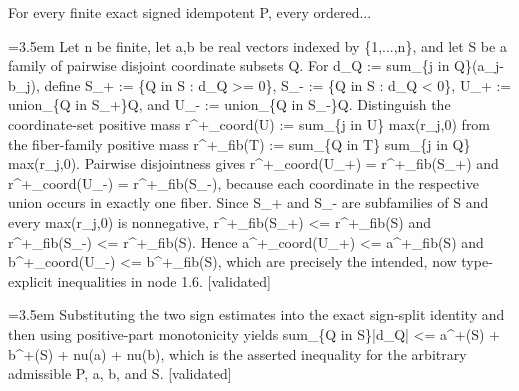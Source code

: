 \documentclass{article}
\newcommand{\step}[1]{\par\noindent\hangindent=3.5em\hangafter=1%
  \makebox[3.5em][l]{\textbf{#1.}}}
\newcommand{\steptag}[1]{\hfill{\small\textsf{[#1]}}}
\begin{document}
\begin{proofbox}{For every finite exact signed idempotent P, every ordered...}
\step{1.6.1} Let n be finite, let a,b be real vectors indexed by \{1,...,n\}, and let S be a family of pairwise disjoint coordinate subsets Q. For d\_Q := sum\_\{j in Q\}(a\_j-b\_j), define S\_+ := \{Q in S : d\_Q >= 0\}, S\_- := \{Q in S : d\_Q < 0\}, U\_+ := union\_\{Q in S\_+\}Q, and U\_- := union\_\{Q in S\_-\}Q. Distinguish the coordinate-set positive mass r\textasciicircum{}+\_coord(U) := sum\_\{j in U\} max(r\_j,0) from the fiber-family positive mass r\textasciicircum{}+\_fib(T) := sum\_\{Q in T\} sum\_\{j in Q\} max(r\_j,0). Pairwise disjointness gives r\textasciicircum{}+\_coord(U\_+) = r\textasciicircum{}+\_fib(S\_+) and r\textasciicircum{}+\_coord(U\_-) = r\textasciicircum{}+\_fib(S\_-), because each coordinate in the respective union occurs in exactly one fiber. Since S\_+ and S\_- are subfamilies of S and every max(r\_j,0) is nonnegative, r\textasciicircum{}+\_fib(S\_+) <= r\textasciicircum{}+\_fib(S) and r\textasciicircum{}+\_fib(S\_-) <= r\textasciicircum{}+\_fib(S). Hence a\textasciicircum{}+\_coord(U\_+) <= a\textasciicircum{}+\_fib(S) and b\textasciicircum{}+\_coord(U\_-) <= b\textasciicircum{}+\_fib(S), which are precisely the intended, now type-explicit inequalities in node 1.6. \steptag{validated} \\[4pt]
\step{1.7} Substituting the two sign estimates into the exact sign-split identity and then using positive-part monotonicity yields sum\_\{Q in S\}|d\_Q| <= a\textasciicircum{}+(S) + b\textasciicircum{}+(S) + nu(a) + nu(b), which is the asserted inequality for the arbitrary admissible P, a, b, and S. \steptag{validated} \\[4pt]
\end{proofbox}
\end{document}
